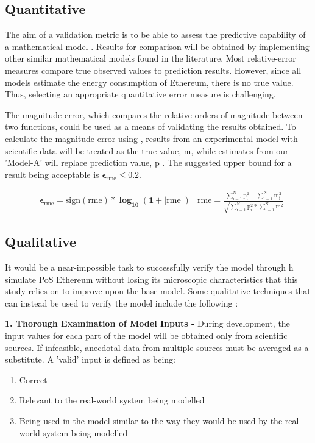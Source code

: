 \subsection{Quantitative}
\label{MethoologyErrorQuant}
The aim of a validation metric is to be able to assess the predictive capability of a mathematical model \cite{Kat2012ValidationError}. Results for comparison will be obtained by implementing other similar mathematical models found in the literature. Most relative-error measures compare true observed values to prediction results. However, since all models estimate the energy consumption of Ethereum, there is no true value. Thus, selecting an appropriate quantitative error measure is challenging. 

The magnitude error, which compares the relative orders of magnitude between two functions, could be used as a means of validating the results obtained. To calculate the magnitude error using , results from an experimental model with scientific data will be treated as the true value, $\boldsymbol{\mathrm{m}}$, while estimates from our 'Model-A' will replace prediction value, $\boldsymbol{\mathrm{p}}$ \cite{RussellErrorMeasure}. The suggested upper bound for a result being acceptable is $\boldsymbol{\epsilon_\mathrm{rme} \leq 0.2}$.

\begin{align}
\label{eqn:ErrorMeasureEqn}
    &\boldsymbol{\epsilon_\mathrm{rme} = \mathrm{sign(rme)} * \log_{10} (1 + |\mathrm{rme}|)}
    &\boldsymbol{ \mathrm{rme} = \mathrm{\frac{\mathrm{\sum\limits_{i=1}^{N} p_{i}^{2}} - \mathrm{\sum\limits_{i=1}^{N} m_{i}^{2}}}{\sqrt{\mathrm{\sum\limits_{i=1}^{N} p_{i}^{2}} * \mathrm{\sum\limits_{i=1}^{N} m_{i}^{2}}}}}}
\end{align}

\subsection{Qualitative}
\label{QualModelEvalMEthodology}
 It would be a near-impossible task to successfully verify the model through h simulate PoS Ethereum without losing its microscopic characteristics that this study relies on to improve upon the base model. Some qualitative techniques that can instead be used to verify the model include the following \cite{Al-Aomar2015ModelTechniques}:

\textbf{1. Thorough Examination of Model Inputs - } During development, the input values for each part of the model will be obtained only from scientific sources. If infeasible, anecdotal data from multiple sources must be averaged as a substitute. A 'valid' input is defined as being:
\begin{enumerate}
    \item Correct
    \item Relevant to the real-world system being modelled
    \item Being used in the model similar to the way they would be used by the real-world system being modelled
\end{enumerate}  

